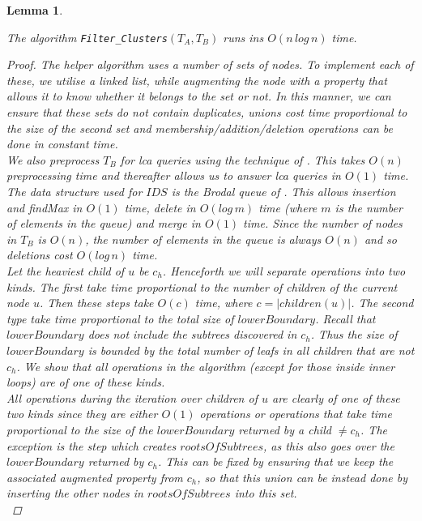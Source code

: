 \documentclass{article}
\newtheorem{filterclustersruntime}[incompatibility]{Lemma}
\begin{document}
    \begin{filterclustersruntime}
        \label{lem:filterclustersruntime}

        The algorithm \texttt{Filter\_Clusters}$(T_A, T_B)$ runs ins $O(n\,log\,n)$ time.

        \begin{proof}
            The helper algorithm uses a number of sets of nodes. To implement each of these, we utilise a linked list, while augmenting the node with a property that allows it to know whether it belongs to the set or not. In this manner, we can ensure that these sets do not contain duplicates, unions cost time proportional to the size of the second set and membership/addition/deletion operations can be done in constant time.\\

            We also preprocess $T_B$ for \textit{lca} queries using the technique of \cite{bender2000lca}. This takes $O(n)$ preprocessing time and thereafter allows us to answer \textit{lca} queries in $O(1)$ time.\\

            The data structure used for $IDS$ is the Brodal queue of \cite{brodal1995fast}. This allows insertion and findMax in $O(1)$ time, delete in $O(log\,m)$ time (where $m$ is the number of elements in the queue) and merge in $O(1)$ time. Since the number of nodes in $T_B$ is $O(n)$, the number of elements in the queue is always $O(n)$ and so deletions cost $O(log\,n)$ time.\\

            Let the heaviest child of $u$ be $c_h$. Henceforth we will separate operations into two kinds. The first take time proportional to the number of children of the current node $u$. Then these steps take $O(c)$ time, where $c = |children(u)|$. The second type take time proportional to the total size of $lowerBoundary$. Recall that $lowerBoundary$ does not include the subtrees discovered in $c_h$. Thus the size of $lowerBoundary$ is bounded by the total number of leafs in all children that are not $c_h$. We show that all operations in the algorithm (except for those inside inner loops) are of one of these kinds.\\

            All operations during the iteration over children of $u$ are clearly of one of these two kinds since they are either $O(1)$ operations or operations that take time proportional to the size of the $lowerBoundary$ returned by a child $\neq c_h$. The exception is the step which creates $rootsOfSubtrees$, as this also goes over the $lowerBoundary$ returned by $c_h$. This can be fixed by ensuring that we keep the associated augmented property from $c_h$, so that this union can be instead done by inserting the other nodes in $rootsOfSubtrees$ into this set.\\


\end{proof}
\end{filterclustersruntime}
\end{document}
